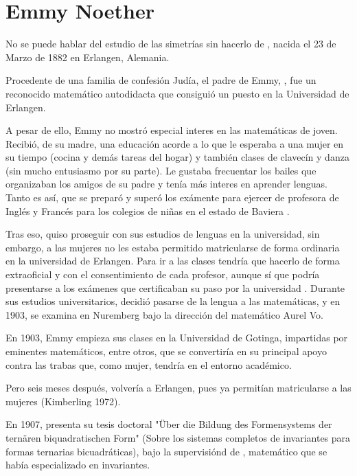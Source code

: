 \section{Emmy Noether}
No se puede hablar del estudio de las simetrías sin hacerlo de , nacida el 23 de Marzo de 1882 en Erlangen, Alemania.

Procedente de una familia de confesión Judía, el padre de Emmy, , fue un reconocido matemático autodidacta que consiguió un puesto en la Universidad de Erlangen.

A pesar de ello, Emmy no mostró especial interes en las matemáticas de joven. Recibió, de su madre, una educación acorde a lo que le esperaba a una mujer en su tiempo (cocina y demás tareas del hogar) y también clases de clavecín y danza (sin mucho entusiasmo por su parte). Le gustaba frecuentar los bailes que organizaban los amigos de su padre y tenía más interes en aprender lenguas. Tanto es así, que se preparó y superó los exámente para ejercer de profesora de Inglés y Francés para los colegios de niñas en el estado de Baviera \cite{Carrasco}.

Tras eso, quiso proseguir con sus estudios de lenguas en la universidad, sin embargo, a las mujeres no les estaba permitido matricularse de forma ordinaria en la universidad de Erlangen. Para ir a las clases tendría que hacerlo de forma extraoficial y con el consentimiento de cada profesor, aunque sí que podría presentarse a los exámenes que certificaban su paso por la universidad \cite{Kimberling}. 
Durante sus estudios universitarios, decidió pasarse de la lengua a las matemáticas, y en 1903, se examina en Nuremberg bajo la dirección del matemático Aurel Vo\beta \cite{Kimberling}.

En 1903, Emmy empieza sus clases en la Universidad de Gotinga, impartidas por eminentes matemáticos, entre otros,  que se convertiría en su principal apoyo contra las trabas que, como mujer, tendría en el entorno académico.

Pero seis meses después, volvería a Erlangen, pues ya permitían matricularse a las mujeres (Kimberling 1972).

En 1907, presenta su tesis doctoral "Über die Bildung des Formensystems der ternären biquadratischen Form" (Sobre los sistemas completos de invariantes para formas ternarias bicuadráticas), bajo la supervisiónd de , matemático que se había especializado en invariantes.

